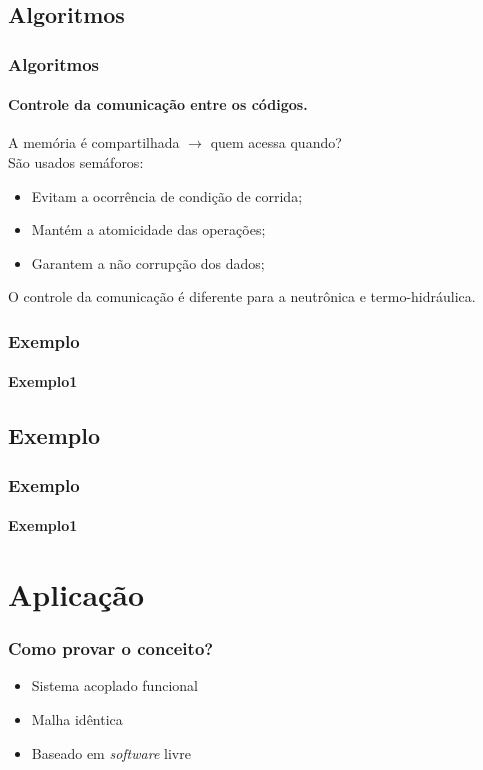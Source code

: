 \documentclass[svgnames,smaller,table]{beamer}
\begin{document}
\subsection{Algoritmos}
\begin{frame}
  \frametitle{Algoritmos}
  \framesubtitle{Controle da comunicação entre os códigos.}
  A memória é compartilhada $\rightarrow$ quem acessa quando?  
  \\
  \vspace{0.5cm}
  São usados semáforos:
  \begin{itemize}
  \item Evitam a ocorrência de condição de corrida;
  \item Mantém a atomicidade das operações;
  \item Garantem a não corrupção dos dados;
  \end{itemize}
  \vspace{0.5cm}
  O controle da comunicação é diferente para a neutrônica e termo-hidráulica.
\end{frame}


{
\begin{frame}
  \frametitle{Exemplo}
  \framesubtitle{Exemplo1}
  
\end{frame}
}


\subsection{Exemplo}
\begin{frame}
  \frametitle{Exemplo}
  \framesubtitle{Exemplo1}
  
\end{frame}



\section{Aplicação}
\begin{frame}
  \frametitle{Como provar o conceito?}
  \begin{itemize}
  \item Sistema acoplado funcional
  \item Malha idêntica
  \item Baseado em \textit{software} livre
  \end{itemize}
\end{frame}
\end{document}
